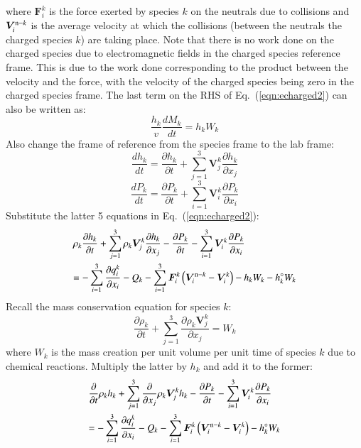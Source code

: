 \documentclass{warpdoc}
\newcommand{\alb}{\vspace{0.1cm}\\} %
\newcommand{\mfd}{\displaystyle}
\renewcommand{\vec}[1]{\bm{#1}}
\begin{document}
%
where $\vec{F}_i^k$ is the force exerted by species $k$ on the neutrals due to collisions and $\vec{V}_i^{{\rm n}-k}$ is the average velocity at which the collisions (between the neutrals the charged species $k$) are taking place. Note that there is no work done on the charged species due to electromagnetic fields in the charged species reference frame. This is due to the work done corresponding to the product between the velocity and the force, with the velocity of the charged species being zero in the charged species frame.  The last term on the RHS of Eq.\ (\ref{eqn:echarged2}) can also be written as:
%
\begin{equation}
  \frac{h_k}{v}\frac{d M_k}{d t} = h_k W_k
\end{equation}
%
Also change the frame of reference from the species frame to the lab frame:
%
\begin{equation}
\frac{d h_k}{d t} = \frac{\partial h_k}{\partial t} + \sum_{j=1}^3 \vec{V}^k_j \frac{\partial h_k}{\partial x_j}
\end{equation}
%
%
\begin{equation}
\frac{d P_k}{d t} = \frac{\partial P_k}{\partial t} + \sum_{i=1}^3 \vec{V}^k_i \frac{\partial P_k}{\partial x_i}
\end{equation}
%
Substitute the latter 5 equations in Eq.\ (\ref{eqn:echarged2}):
%
\begin{equation}
\begin{array}{l}\mfd
\rho_k \frac{\partial h_k}{\partial t} + \sum_{j=1}^3 \rho_k \vec{V}^k_j \frac{\partial h_k}{\partial x_j} 
- \frac{\partial P_k}{\partial t} - \sum_{i=1}^3 \vec{V}^k_i \frac{\partial P_k}{\partial x_i}
\alb\mfd
= 
-\sum_{i=1}^{3}\frac{\partial q_i^k}{\partial x_i}
-Q_{k}
-\sum_{i=1}^3 \vec{F}_i^k \left( \vec{V}_i^{{\rm n}-k}-\vec{V}_i^k \right)
-h_k W_k - h_k^\circ W_k
\end{array}
\label{eqn:echarged3}
\end{equation}
%  
Recall the mass conservation equation for species $k$:
%
\begin{equation}
\frac{\partial \rho_k}{\partial t}+ \sum_{j=1}^3 \frac{\partial \rho_k \vec{V}^k_j}{\partial x_j}=W_k 
\end{equation}
%
where $W_k$ is the mass creation per unit volume per unit time of species $k$ due to chemical reactions. Multiply the latter by $h_k$ and add it to the former:
%
\begin{equation}
\begin{array}{l}\mfd
 \frac{\partial }{\partial t}\rho_k h_k + \sum_{j=1}^3  \frac{\partial }{\partial x_j} \rho_k \vec{V}^k_j h_k 
- \frac{\partial P_k}{\partial t} - \sum_{i=1}^3 \vec{V}^k_i \frac{\partial P_k}{\partial x_i}
\alb\mfd
= 
-\sum_{i=1}^{3}\frac{\partial q_i^k}{\partial x_i}
-Q_{k}
-\sum_{i=1}^3 \vec{F}_i^k \left( \vec{V}_i^{{\rm n}-k}-\vec{V}_i^k \right)
- h_k^\circ W_k
\end{array}
\end{equation}
\end{document}

